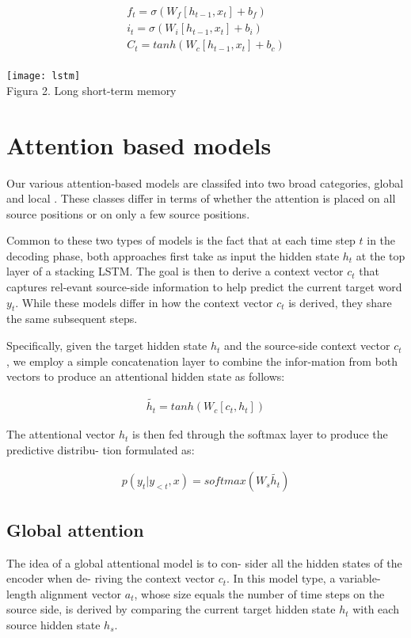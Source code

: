 \begin{gather*}
  f_{t} = \sigma(W_{f}[h_{t-1},x_{t}]+b_{f}) \\
  i_{t} = \sigma(W_{i}[h_{t-1},x_{t}]+b_{i}) \\
  C_{t} = tanh(W_{c}[h_{t-1},x_{t}]+b_{c})   \\
\end{gather*}


\begin{center}
\texttt{[image: lstm]} \\%
    Figura 2. Long short-term memory
\end{center}

\section{Attention based models}

Our various  attention-based  models  are classifed
into two broad categories, global and local
. These classes differ in terms of whether the attention
is placed on all source positions or on only a few
source  positions.

Common to these two types of models is the fact
that at each time step $t$ in the decoding phase, both
approaches first take as input the hidden state $h_{t}$
at the top layer of a stacking LSTM. The goal is
then to derive a context vector $c_{t}$ that captures rel-evant source-side  information  to help predict  the current target word
$y_{t}$. While these models differ in how the context vector $c_{t}$
is derived, they share the same subsequent steps.

Specifically, given the target hidden state $h_{t}$
and the  source-side  context  vector $c_{t}$
,  we  employ  a simple concatenation  layer to combine the infor-mation 
from both vectors to produce an attentional hidden state as follows:

\begin{gather*}
  \widetilde{h_{t}} = tanh(W_{c}[c_{t},h_{t}])
\end{gather*}

The attentional vector $h_{t}$ is then fed through the
softmax  layer  to  produce  the  predictive  distribu-
tion formulated as:

\begin{gather*}
  p(y_{t}|y_{<t},x) = softmax(W_{s}\widetilde{h_{t}})
\end{gather*}

\subsection{Global attention}
The idea of a global attentional  model is to con-
sider all the hidden states of the encoder when de-
riving  the  context  vector $c_{t}$. In this  model  type,
a variable-length alignment vector $a_{t}$, whose size
equals the number of time steps on the source side,
is derived by comparing the current target hidden state
$h_{t}$ with each source hidden state $h_{s}$.

